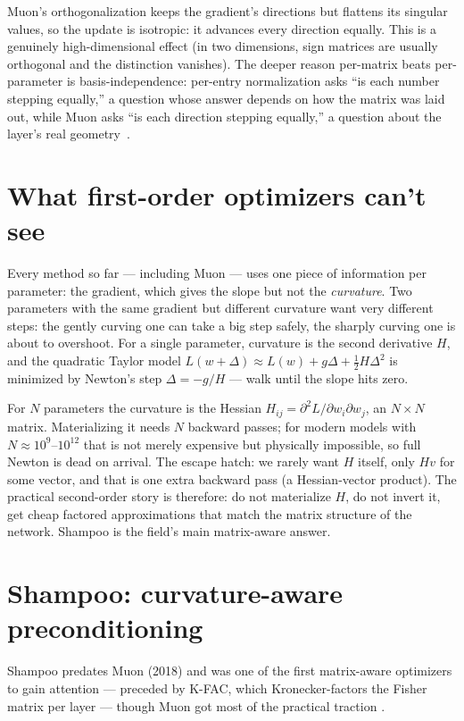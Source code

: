 \documentclass[10pt,conference]{IEEEtran}
\begin{document}
Muon's orthogonalization keeps the gradient's directions but flattens its
singular values, so the update is isotropic: it advances every direction
equally. This is a genuinely high-dimensional effect (in two dimensions, sign
matrices are usually orthogonal and the distinction vanishes). The deeper reason
per-matrix beats per-parameter is basis-independence: per-entry normalization asks
``is each number stepping equally,'' a question whose answer depends on how the
matrix was laid out, while Muon asks ``is each direction stepping equally,'' a
question about the layer's real geometry~\cite{ref14}.

\section{What first-order optimizers can't see}
Every method so far --- including Muon --- uses one piece of information per
parameter: the gradient, which gives the slope but not the \emph{curvature}. Two
parameters with the same gradient but different curvature want very different
steps: the gently curving one can take a big step safely, the sharply curving one
is about to overshoot. For a single parameter, curvature is the second derivative
$H$, and the quadratic Taylor model $L(w+\Delta)\approx L(w)+g\Delta+\tfrac12 H
\Delta^2$ is minimized by Newton's step $\Delta=-g/H$ --- walk until the slope
hits zero.

For $N$ parameters the curvature is the Hessian $H_{ij}=\partial^2 L/\partial w_i
\partial w_j$, an $N\times N$ matrix. Materializing it needs $N$ backward passes;
for modern models with $N\approx 10^9$--$10^{12}$ that is not merely expensive but
physically impossible, so full Newton is dead on arrival. The escape hatch: we
rarely want $H$ itself, only $H v$ for some vector, and that is one extra backward
pass (a Hessian-vector product). The practical second-order story is therefore:
do not materialize $H$, do not invert it, get cheap factored approximations that
match the matrix structure of the network. Shampoo is the field's main
matrix-aware answer.

\section{Shampoo: curvature-aware preconditioning}
Shampoo predates Muon (2018) and was one of the first matrix-aware optimizers to
gain attention --- preceded by K-FAC, which Kronecker-factors the Fisher matrix
per layer \cite{ref28} --- though Muon got most of the practical traction \cite{ref7}.
\end{document}
